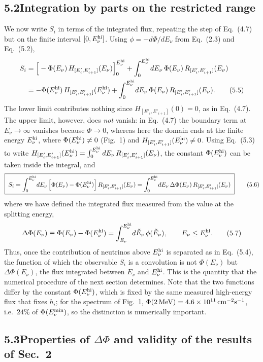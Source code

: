 \documentclass[11pt,a4paper]{article}
\newcommand{\Ev}{E_\nu}
\newcommand{\Ei}{E'_i}
\newcommand{\Eii}{E'_{i+1}}
\newcommand{\Etwo}{E_\nu^{\rm hi}}
\newcommand{\Emin}{E_\nu^{\rm min}}
\newcommand{\Hi}{H_{[\Ei,\Eii]}}
\newcommand{\Ri}{R_{[\Ei,\Eii]}}
\newcommand{\dPhi}{\Delta\Phi}
\begin{document}
\subsection*{5.2\quad Integration by parts on the restricted range}

We now write $S_i$ in terms of the integrated flux, repeating the step of Eq.~(4.7) but on the
finite interval $[0,\Etwo]$. Using $\phi=-d\Phi/d\Ev$ from Eq.~(2.3) and Eq.~(5.2),
\begin{align}
S_i&=\Big[-\Phi(\Ev)\,\Hi(\Ev)\Big]_{0}^{\Etwo}
+\int_0^{\Etwo}\!d\Ev\,\Phi(\Ev)\,\Ri(\Ev)\nonumber\\
&=-\Phi(\Etwo)\,\Hi(\Etwo)+\int_0^{\Etwo}\!d\Ev\,\Phi(\Ev)\,\Ri(\Ev).
\tag{5.5}
\end{align}
The lower limit contributes nothing since $\Hi(0)=0$, as in Eq.~(4.7). The upper limit,
however, does \emph{not} vanish: in Eq.~(4.7) the boundary term at $\Ev\to\infty$ vanishes
because $\Phi\to0$, whereas here the domain ends at the finite energy $\Etwo$, where
$\Phi(\Etwo)\neq0$ (Fig.~1) and $\Hi(\Etwo)\neq0$. Using Eq.~(5.3) to write
$\Hi(\Etwo)=\int_0^{\Etwo}d\Ev\,\Ri(\Ev)$, the constant $\Phi(\Etwo)$ can be taken inside the
integral, and
\begin{equation}
\boxed{\;
S_i=\int_0^{\Etwo}\!d\Ev\,\Big[\Phi(\Ev)-\Phi(\Etwo)\Big]\,\Ri(\Ev)
=\int_0^{\Etwo}\!d\Ev\,\dPhi(\Ev)\,\Ri(\Ev)\;}
\tag{5.6}
\end{equation}
where we have defined the integrated flux measured from the value at the splitting energy,
\begin{equation}
\dPhi(\Ev)\equiv\Phi(\Ev)-\Phi(\Etwo)=\int_{\Ev}^{\Etwo}\!d\tilde E_\nu\,\phi(\tilde E_\nu),
\qquad \Ev\le\Etwo .
\tag{5.7}
\end{equation}
Thus, once the contribution of neutrinos above $\Etwo$ is separated as in Eq.~(5.4), the
function of which the observable $S_i$ is a convolution is not $\Phi(\Ev)$ but $\dPhi(\Ev)$,
the flux integrated between $\Ev$ and $\Etwo$. This is the quantity that the numerical
procedure of the next section determines. Note that the two functions differ by the constant
$\Phi(\Etwo)$, which is fixed by the same measured high-energy flux that fixes $h_i$; for the
spectrum of Fig.~1, $\Phi(2\,{\rm MeV})=4.6\times10^{11}\,{\rm cm^{-2}s^{-1}}$, i.e.\ $24\%$ of
$\Phi(\Emin)$, so the distinction is numerically important.

\subsection*{5.3\quad Properties of $\dPhi$ and validity of the results of Sec.~2}
\end{document}
